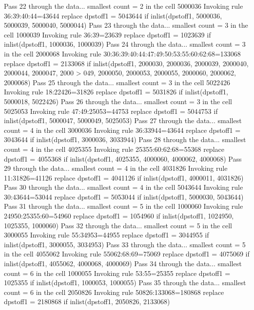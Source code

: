 Pass 22 through the data...
  smallest count = 2 in the cell      5000036
  Invoking rule 36:39:40:44=43644
  replace dpstoff1 = 5043644 if inlist(dpstoff1, 5000036, 5000039, 5000040, 5000044)
Pass 23 through the data...
  smallest count = 3 in the cell      1000039
  Invoking rule 36:39=23639
  replace dpstoff1 = 1023639 if inlist(dpstoff1, 1000036, 1000039)
Pass 24 through the data...
  smallest count = 3 in the cell      2000068
  Invoking rule 30:36:39:40:44:47:49:50:53:55:60:62:68=133068
  replace dpstoff1 = 2133068 if inlist(dpstoff1, 2000030, 2000036, 2000039, 2000040, 2000044, 2000047, 2000
> 049, 2000050, 2000053, 2000055, 2000060, 2000062, 2000068)
Pass 25 through the data...
  smallest count = 3 in the cell      5022426
  Invoking rule 18:22426=31826
  replace dpstoff1 = 5031826 if inlist(dpstoff1, 5000018, 5022426)
Pass 26 through the data...
  smallest count = 3 in the cell      5025053
  Invoking rule 47:49:25053=44753
  replace dpstoff1 = 5044753 if inlist(dpstoff1, 5000047, 5000049, 5025053)
Pass 27 through the data...
  smallest count = 4 in the cell      3000036
  Invoking rule 36:33944=43644
  replace dpstoff1 = 3043644 if inlist(dpstoff1, 3000036, 3033944)
Pass 28 through the data...
  smallest count = 4 in the cell      4025355
  Invoking rule 25355:60:62:68=55368
  replace dpstoff1 = 4055368 if inlist(dpstoff1, 4025355, 4000060, 4000062, 4000068)
Pass 29 through the data...
  smallest count = 4 in the cell      4031826
  Invoking rule 11:31826=41126
  replace dpstoff1 = 4041126 if inlist(dpstoff1, 4000011, 4031826)
Pass 30 through the data...
  smallest count = 4 in the cell      5043644
  Invoking rule 30:43644=53044
  replace dpstoff1 = 5053044 if inlist(dpstoff1, 5000030, 5043644)
Pass 31 through the data...
  smallest count = 5 in the cell      1000060
  Invoking rule 24950:25355:60=54960
  replace dpstoff1 = 1054960 if inlist(dpstoff1, 1024950, 1025355, 1000060)
Pass 32 through the data...
  smallest count = 5 in the cell      3000055
  Invoking rule 55:34953=44955
  replace dpstoff1 = 3044955 if inlist(dpstoff1, 3000055, 3034953)
Pass 33 through the data...
  smallest count = 5 in the cell      4055062
  Invoking rule 55062:68:69=75069
  replace dpstoff1 = 4075069 if inlist(dpstoff1, 4055062, 4000068, 4000069)
Pass 34 through the data...
  smallest count = 6 in the cell      1000055
  Invoking rule 53:55=25355
  replace dpstoff1 = 1025355 if inlist(dpstoff1, 1000053, 1000055)
Pass 35 through the data...
  smallest count = 6 in the cell      2050826
  Invoking rule 50826:133068=180868
  replace dpstoff1 = 2180868 if inlist(dpstoff1, 2050826, 2133068)
